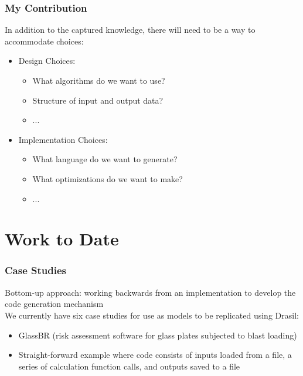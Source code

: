 \documentclass{beamer}
\begin{document}
\begin{frame}

\frametitle{My Contribution}
In addition to the captured knowledge, there will need to be a 
way to accommodate choices:
\begin{itemize}
\item  Design Choices:
\begin{itemize}
\item What algorithms do we want to use?
\item Structure of input and output data?
\item ...
\end{itemize}
\item  Implementation Choices:
\begin{itemize}
\item What language do we want to generate?
\item What optimizations do we want to make?
\item ...
\end{itemize}
\end{itemize}


\end{frame}


\section[Work to Date]{Work to Date}


\begin{frame}

\frametitle{Case Studies}

Bottom-up approach:  working backwards from an implementation to develop the code generation mechanism\\[12pt]

We currently have six case studies for use as models to be replicated using Drasil:
\begin{itemize}
\item GlassBR (risk assessment software for glass plates subjected to blast loading) 
\item Straight-forward example where code consists of inputs loaded from a file, a series of calculation function calls, and outputs saved to a file
\end{itemize}


\end{frame}
\end{document}
